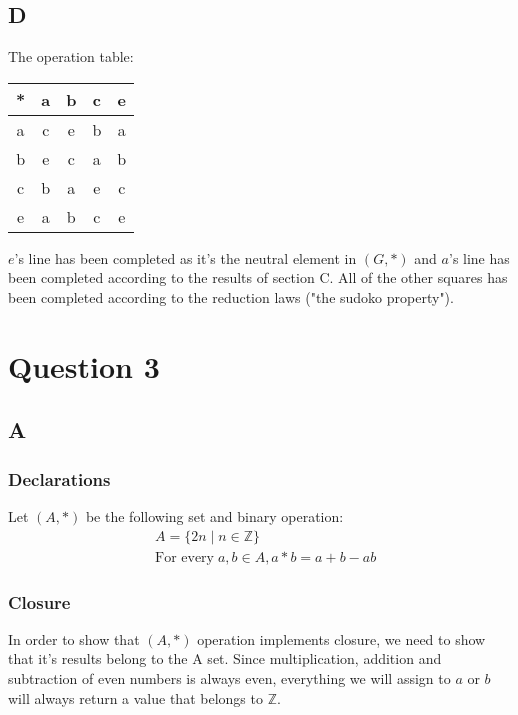 \documentclass[12pt, oneside]{article}
\begin{document}
\subsection{D}
The operation table:
\begin{center}
\begin{tabular}{c | c | c | c | c}
* & a & b & c & e\\
\hline
a & c & e & b & a\\
\hline
b & e & c & a & b\\
\hline
c & b & a & e & c\\
\hline
e & a & b & c & e\\
\end{tabular}
\end{center}
$e$'s line has been completed as it's the neutral element in $(G, *)$ and $a$'s line has been completed according to the results of section C. All of the other squares has been completed according to the reduction laws ("the sudoko property").

\section{Question 3}
\subsection{A}
\setcounter{subsubsection}{-1}
\subsubsection{Declarations}
Let $(A, *)$ be the following set and binary operation:
\begin{eqnarray*}
& A = \{2n\;|\;n \in \mathbb{Z}\}\\
& \text{For every}\;a,b \in A, a * b = a + b - ab
\end{eqnarray*}

\subsubsection{Closure}
In order to show that $(A, *)$ operation implements closure, we need to show that it’s results belong to the A set. Since multiplication, addition and subtraction of even numbers is always even, everything we will assign to $a$ or $b$ will always return a value that belongs to $\mathbb{Z}$.
\end{document}
